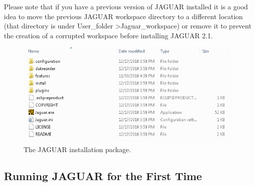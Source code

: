\begin{itemize}
Please note that if you have a previous version of JAGUAR installed it is a good idea to 
move the previous JAGUAR workspace directory to a different location (that directory is 
under User\_folder \textgreater Jaguar\_workspace) or remove it to prevent the creation 
of a corrupted workspace before installing JAGUAR 2.1.

\begin{figure}
  \centering
  \includegraphics[scale=0.6]{images/2_1jag_package}
  \caption{The JAGUAR installation package.}
  \label{fig:input:jag_package}
\end{figure}

\end{itemize}

\subsection{Running JAGUAR for the First Time}

